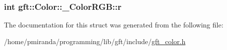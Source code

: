 \subsubsection[{\texorpdfstring{r}{r}}]{\setlength{\rightskip}{0pt plus 5cm}int gft\+::\+Color\+::\+\_\+\+Color\+R\+G\+B\+::r}\hypertarget{structgft_1_1Color_1_1__ColorRGB_aef66edd58713d34d554205dd8fb636ad}{}\label{structgft_1_1Color_1_1__ColorRGB_aef66edd58713d34d554205dd8fb636ad}


The documentation for this struct was generated from the following file\+:\begin{DoxyCompactItemize}
\item 
/home/pmiranda/programming/lib/gft/include/\hyperlink{gft__color_8h}{gft\+\_\+color.\+h}\end{DoxyCompactItemize}
